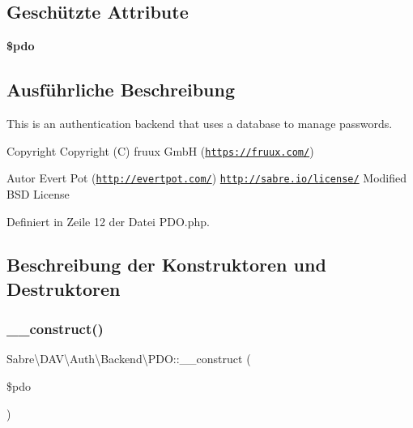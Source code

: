 \subsection*{Geschützte Attribute}
\begin{DoxyCompactItemize}
\item 
\mbox{\label{class_sabre_1_1_d_a_v_1_1_auth_1_1_backend_1_1_p_d_o_a1a28bd59b9529d32d03cc35587d1950d}} 
{\bfseries \$pdo}
\end{DoxyCompactItemize}


\subsection{Ausführliche Beschreibung}
This is an authentication backend that uses a database to manage passwords.

\begin{DoxyCopyright}{Copyright}
Copyright (C) fruux GmbH (\href{https://fruux.com/}{\tt https\+://fruux.\+com/}) 
\end{DoxyCopyright}
\begin{DoxyAuthor}{Autor}
Evert Pot (\href{http://evertpot.com/}{\tt http\+://evertpot.\+com/})  \href{http://sabre.io/license/}{\tt http\+://sabre.\+io/license/} Modified B\+SD License 
\end{DoxyAuthor}


Definiert in Zeile 12 der Datei P\+D\+O.\+php.



\subsection{Beschreibung der Konstruktoren und Destruktoren}
\mbox{\label{class_sabre_1_1_d_a_v_1_1_auth_1_1_backend_1_1_p_d_o_a15e35f8396884fad19af06d9b85f9db8}} 
\subsubsection{\texorpdfstring{\+\_\+\+\_\+construct()}{\_\_construct()}}
{\footnotesize\ttfamily Sabre\textbackslash{}\+D\+A\+V\textbackslash{}\+Auth\textbackslash{}\+Backend\textbackslash{}\+P\+D\+O\+::\+\_\+\+\_\+construct (\begin{DoxyParamCaption}\item[{\textbackslash{}\mbox{\hyperlink{class_sabre_1_1_d_a_v_1_1_auth_1_1_backend_1_1_p_d_o}{P\+DO}}}]{\$pdo }\end{DoxyParamCaption})}


